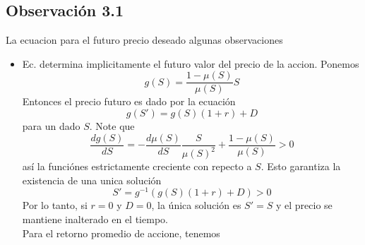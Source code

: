 \documentclass[12pt]{article}
\begin{document}
\subsection*{Observación 3.1}
La ecuacion para el futuro precio deseado algunas observaciones 
\begin{itemize}
\item Ec.\cite{ec22} determina implicitamente el futuro valor del precio de la accion. Ponemos
$$
g(S)=\frac{1-\mu(S)}{\mu(S)}S
$$
Entonces el precio futuro es dado por la ecuación
$$
g(S') = g(S)(1+r)+D
$$
para un dado $S$. Note que
$$
\frac{dg(S)}{dS}=-\frac{d\mu(S)}{dS}\frac{S}{\mu(S)^2}+\frac{1-\mu(S)}{\mu(S)}>0
$$
así la funciónes estrictamente creciente con repecto a $S$. Esto garantiza la existencia de una unica solución
\begin{equation}
S'=g^{-1}(g(S)(1+r)+D)>0
\end{equation}
Por lo tanto, si $r=0$ y $D=0$, la única solución es $S'=S$ y el precio se mantiene inalterado en el tiempo.\\
Para el retorno promedio de accione, tenemos


\end{itemize}
\end{document}
